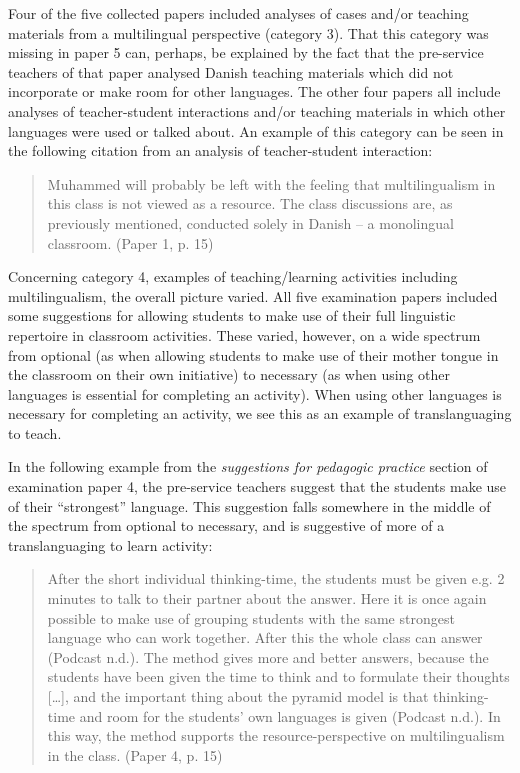 \documentclass[output=paper]{langscibook}
\begin{document}
Four of the five collected papers included analyses of cases and/or teaching materials from a multilingual perspective (category 3). That this category was missing in paper 5 can, perhaps, be explained by the fact that the pre-service teachers of that paper analysed Danish teaching materials which did not incorporate or make room for other languages. The other four papers all include analyses of teacher-student interactions and/or teaching materials in which other languages were used or talked about. An example of this category can be seen in the following citation from an analysis of teacher-student interaction:

\begin{quote}
Muhammed will probably be left with the feeling that multilingualism in this class is not viewed as a resource. The class discussions are, as previously mentioned, conducted solely in Danish – a monolingual classroom. (Paper 1, p. 15)
\end{quote}

Concerning category 4, examples of teaching/learning activities including multilingualism, the overall picture varied. All five examination papers included some suggestions for allowing students to make use of their full linguistic repertoire in classroom activities. These varied, however, on a wide spectrum from optional (as when allowing students to make use of their mother tongue in the classroom on their own initiative) to necessary (as when using other languages is essential for completing an activity). When using other languages is necessary for completing an activity, we see this as an example of translanguaging to teach. 

In the following example from the \textit{suggestions for pedagogic practice} section of examination paper 4, the pre-service teachers suggest that the students make use of their “strongest” language. This suggestion falls somewhere in the middle of the spectrum from optional to necessary, and is suggestive of more of a translanguaging to learn activity:

\begin{quote}
After the short individual thinking-time, the students must be given e.g. 2 minutes to talk to their partner about the answer. Here it is once again possible to make use of grouping students with the same strongest language who can work together. After this the whole class can answer (Podcast n.d.). The method gives more and better answers, because the students have been given the time to think and to formulate their thoughts […], and the important thing about the pyramid model is that thinking-time and room for the students’ own languages is given (Podcast n.d.). In this way, the method supports the resource-perspective on multilingualism in the class.  (Paper 4, p. 15)
\end{quote}
\end{document}
